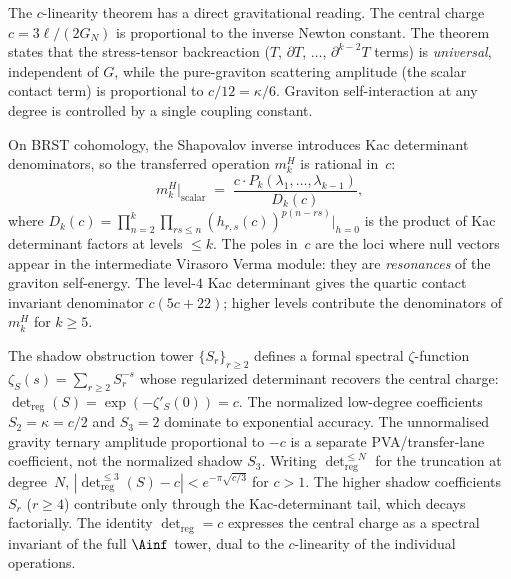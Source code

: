 \begin{remark}
\label{rem:gravity-c-linearity-physics}
The $c$-linearity theorem has a direct gravitational reading.
The central charge $c = 3\ell/(2G_N)$ is proportional to the
inverse Newton constant. The theorem states that the
stress-tensor backreaction ($T$, $\partial T$, $\ldots$,
$\partial^{k-2}T$ terms) is \emph{universal}, independent
of $G$, while the pure-graviton scattering amplitude (the
scalar contact term) is proportional to $c/12 = \kappa/6$.
Graviton self-interaction at any degree is controlled by a single
coupling constant.

On BRST cohomology, the Shapovalov inverse introduces Kac
determinant denominators, so the transferred operation
$m_k^H$ is rational in~$c$:
\[
m_k^H\big|_{\text{scalar}}
\;=\;
\frac{c \cdot P_k(\lambda_1, \ldots, \lambda_{k-1})}
 {D_k(c)},
\]
where $D_k(c) = \prod_{n=2}^{k}\prod_{rs \le n}
(h_{r,s}(c))^{p(n-rs)}\big|_{h=0}$ is the product of Kac
determinant factors at levels $\le k$. The poles in~$c$ are
the loci where null vectors appear in the intermediate Virasoro
Verma module: they are \emph{resonances} of the graviton
self-energy. The level-$4$ Kac determinant gives the quartic
contact invariant denominator $c(5c+22)$; higher levels
contribute the denominators of $m_k^H$ for $k \ge 5$.
\end{remark}

\begin{remark}%
\label{rem:det-reg-shadow}%
%
%
The shadow obstruction tower $\{S_r\}_{r \ge 2}$ defines a formal spectral
$\zeta$-function $\zeta_S(s) = \sum_{r \ge 2} S_r^{-s}$ whose
regularized determinant recovers the central charge:
$\det_{\mathrm{reg}}(S) = \exp(-\zeta'_S(0)) = c$.
The normalized low-degree coefficients $S_2 = \kappa = c/2$ and
$S_3=2$ dominate to exponential accuracy.  The unnormalised gravity
ternary amplitude proportional to $-c$ is a separate PVA/transfer-lane
coefficient, not the normalized shadow $S_3$.  Writing
$\det_{\mathrm{reg}}^{\le N}$ for the truncation at degree~$N$,
$|\det_{\mathrm{reg}}^{\le 3}(S) - c| < e^{-\pi\sqrt{c/3}}$
for $c > 1$. The higher shadow coefficients $S_r$ ($r \ge 4$)
contribute only through the Kac-determinant tail, which decays
factorially. The identity $\det_{\mathrm{reg}} = c$ expresses
the central charge as a spectral invariant of the full $\Ainf$
tower, dual to the $c$-linearity of the individual operations.
\end{remark}

